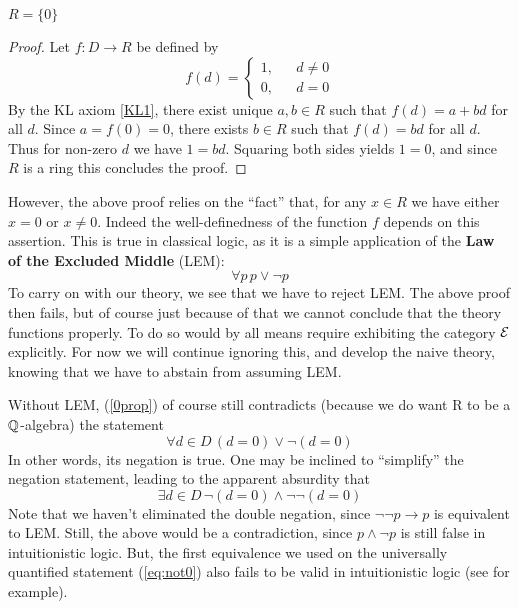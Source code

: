 \begin{proposition}
  \label{0prop}
  \( R=\{0\} \)
\end{proposition}

\begin{proof}
  Let \( f:D\to R \) be defined by
  \begin{equation*}
    f(d) =
    \left\{ 
      \begin{aligned}
	1,& & d \neq 0 \\
	0,& & d = 0
      \end{aligned}
    \right.
  \end{equation*}
By the KL axiom \ref{KL1}, there exist unique \( a,b\in R \) such that \( f(d) = a + bd \) for all \( d \). Since \( a =  f(0) = 0 \), there exists \( b\in R \) such that \( f(d) = bd \) for all \( d \). Thus for non-zero \( d \) we have \( 1 = bd \). Squaring both sides yields \( 1 = 0 \), and since \( R \) is a ring this concludes the proof.
\end{proof}

However, the above proof relies on the ``fact'' that, for any \( x\in R \) we have either \( x = 0 \) or \( x\neq0 \). Indeed the well-definedness of the function \( f \) depends on this assertion. This is true in classical logic, as it is a simple application of the \textbf{Law of the Excluded Middle} (LEM):
\begin{equation*}
  \forall p\, p\vee \neg p
\end{equation*}
To carry on with our theory, we see that we have to reject LEM. The above proof then fails, but of course just because of that we cannot conclude that the theory functions properly. To do so would by all means require exhibiting the category \( \mathcal{E} \) explicitly. For now we will continue ignoring this, and develop the naive theory, knowing that we have to abstain from assuming LEM.

Without LEM, (\ref{0prop}) of course still contradicts (because we do want R to be a \( \mathbb{Q} \)-algebra) the statement
\begin{equation}
  \forall d\in D\,(d=0) \vee \neg (d=0)
  \label{eq:not0}
\end{equation}
In other words, its negation is true. One may be inclined to ``simplify'' the negation statement, leading to the apparent absurdity that
\begin{equation*}
  \exists d\in D\, \neg(d=0) \wedge \neg\neg (d=0)
\end{equation*}
Note that we haven't eliminated the double negation, since \( \neg\neg p\rightarrow p \) is equivalent to LEM. Still, the above would be a contradiction, since \( p\wedge \neg p \) is still false in intuitionistic logic. But, the first equivalence we used on the universally quantified statement (\ref{eq:not0}) also fails to be valid in intuitionistic logic (see \cite[p. 248]{fra84} for example).

